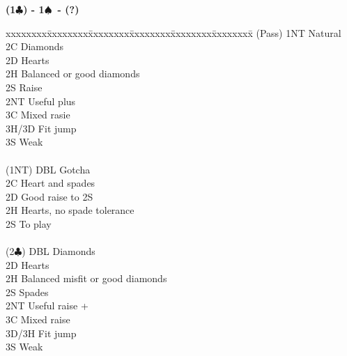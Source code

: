 \documentclass[10pt]{article}
\renewcommand{\c}{$\clubsuit$}
\newcommand{\s}{$\spadesuit$}
\newenvironment{bidtable}[1][]
{\textbf{#1}
  \begin{adjustwidth}{1em}{}
    \addvspace{2pt}
    \begin{tabbing}
      xxxxxxxx\=xxxxxxxx\=xxxxxxxx\=xxxxxxxx\=xxxxxxxx\=xxxxxxxx\=\kill}
{\end{tabbing}\end{adjustwidth}\bigskip}%
\begin{document}
\begin{multicols*}{2}
\begin{bidtable}[(1\c) - 1\s\ - (?)]
(Pass)    \> 1NT   \> Natural                                   \\
          \> 2C    \> Diamonds                                  \\
          \> 2D    \> Hearts                                    \\
          \> 2H    \> Balanced or good diamonds                 \\
          \> 2S    \> Raise                                     \\
          \> 2NT   \> Useful plus                               \\
          \> 3C    \> Mixed rasie                               \\
          \> 3H/3D \> Fit jump                                  \\
          \> 3S    \> Weak                                      \\
                                                                \\
(1NT)     \> DBL   \> Gotcha                                    \\
          \> 2C    \> Heart and spades                          \\
          \> 2D    \> Good raise to 2S                          \\
          \> 2H    \> Hearts, no spade tolerance                \\
          \> 2S    \> To play                                   \\
                                                                \\
(2\c)     \> DBL   \> Diamonds                                  \\
          \> 2D    \> Hearts                                    \\
          \> 2H    \> Balanced misfit or good diamonds          \\
          \> 2S    \> Spades                                    \\
          \> 2NT   \> Useful raise +                            \\
          \> 3C    \> Mixed raise                               \\
          \> 3D/3H \> Fit jump                                  \\
          \> 3S    \> Weak                                      \\

\end{bidtable}
\end{multicols*}
\end{document}
